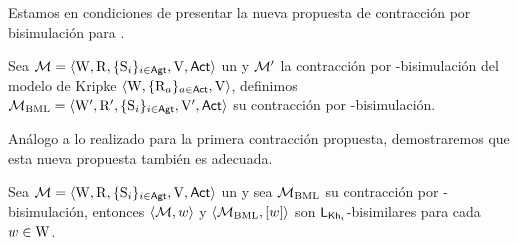 Estamos en condiciones de presentar la nueva propuesta de contracción por bisimulación para \KHilogic.

\begin{definicion}
    Sea $\mathcal{M}=\langle \mathrm{W},\mathrm{R},\{ \mathrm{S}_i \}_{i \in {\rm \sf Agt}},\mathrm{V},{\rm \sf Act} \rangle$ un \ults y $\mathcal{M}'$
    la contracción por \bml-bisimulación del modelo de Kripke $\langle \mathrm{W},\{\mathrm{R}_a\}_{a\in{\rm \sf Act}},\mathrm{V} \rangle$, definimos 
    $\mathcal{M}_\mathrm{BML}=\langle \mathrm{W}', \mathrm{R}', \{ \mathrm{S}_i \}_{i\in{\rm \sf Agt}},\mathrm{V}',{\rm \sf Act} \rangle$ su contracción por \KHilogic-bisimulación.
\end{definicion}

Análogo a lo realizado para la primera contracción propuesta, demostraremos que esta nueva propuesta también es 
adecuada. 

\begin{teorema}\label{thm:adequacy-2nd-cont}
    Sea $\mathcal{M}=\langle \mathrm{W},\mathrm{R},\{ \mathrm{S}_i \}_{i \in {\rm \sf Agt}},\mathrm{V},{\rm \sf Act} \rangle$ un \ults y sea $\mathcal{M}_\mathrm{BML}$ 
    su contracción por \KHilogic-bisimulación, 
    entonces $\langle \mathcal{M},w \rangle$ y $\langle \mathcal{M}_\mathrm{BML},[w] \rangle$ son $\mathsf{L}_{\mathsf{Kh}_i}$-bisimilares para cada $w \in \mathrm{W}$.
\end{teorema}

